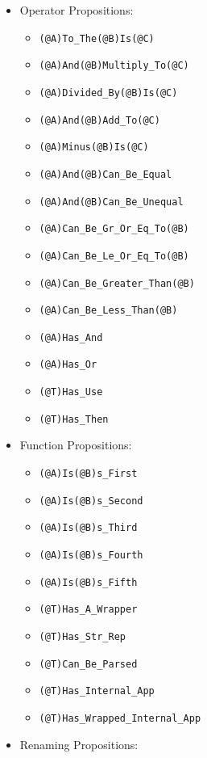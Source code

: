 \documentclass{article}
\begin{document}
\begin{itemize}

\item Operator Propositions:

  \begin{itemize}
  \item \verb|(@A)To_The(@B)Is(@C)|
  \item \verb|(@A)And(@B)Multiply_To(@C)|
  \item \verb|(@A)Divided_By(@B)Is(@C)|
  \item \verb|(@A)And(@B)Add_To(@C)|
  \item \verb|(@A)Minus(@B)Is(@C)|
  \item \verb|(@A)And(@B)Can_Be_Equal|
  \item \verb|(@A)And(@B)Can_Be_Unequal|
  \item \verb|(@A)Can_Be_Gr_Or_Eq_To(@B)|
  \item \verb|(@A)Can_Be_Le_Or_Eq_To(@B)|
  \item \verb|(@A)Can_Be_Greater_Than(@B)|
  \item \verb|(@A)Can_Be_Less_Than(@B)|
  \item \verb|(@A)Has_And|
  \item \verb|(@A)Has_Or|
  \item \verb|(@T)Has_Use|
  \item \verb|(@T)Has_Then|
  \end{itemize}

\item Function Propositions:

  \begin{itemize}
  \item \verb|(@A)Is(@B)s_First|
  \item \verb|(@A)Is(@B)s_Second|
  \item \verb|(@A)Is(@B)s_Third|
  \item \verb|(@A)Is(@B)s_Fourth|
  \item \verb|(@A)Is(@B)s_Fifth|
  \item \verb|(@T)Has_A_Wrapper|
  \item \verb|(@T)Has_Str_Rep|
  \item \verb|(@T)Can_Be_Parsed|
  \item \verb|(@T)Has_Internal_App|
  \item \verb|(@T)Has_Wrapped_Internal_App|
  \end{itemize}

\item Renaming Propositions:


\end{itemize}
\end{document}
